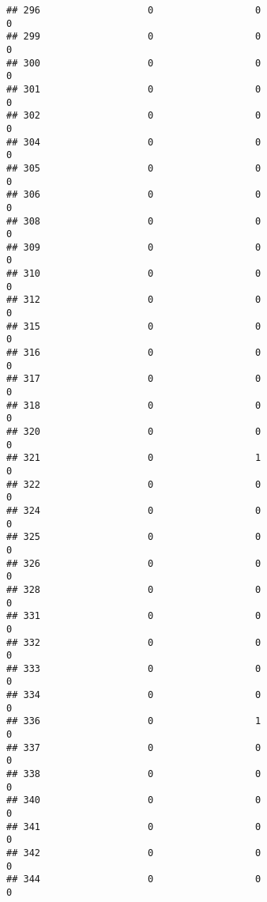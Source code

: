 \documentclass[
]{article}
\begin{document}
\begin{verbatim}
## 296                   0                  0                              0
## 299                   0                  0                              0
## 300                   0                  0                              0
## 301                   0                  0                              0
## 302                   0                  0                              0
## 304                   0                  0                              0
## 305                   0                  0                              0
## 306                   0                  0                              0
## 308                   0                  0                              0
## 309                   0                  0                              0
## 310                   0                  0                              0
## 312                   0                  0                              0
## 315                   0                  0                              0
## 316                   0                  0                              0
## 317                   0                  0                              0
## 318                   0                  0                              0
## 320                   0                  0                              0
## 321                   0                  1                              0
## 322                   0                  0                              0
## 324                   0                  0                              0
## 325                   0                  0                              0
## 326                   0                  0                              0
## 328                   0                  0                              0
## 331                   0                  0                              0
## 332                   0                  0                              0
## 333                   0                  0                              0
## 334                   0                  0                              0
## 336                   0                  1                              0
## 337                   0                  0                              0
## 338                   0                  0                              0
## 340                   0                  0                              0
## 341                   0                  0                              0
## 342                   0                  0                              0
## 344                   0                  0                              0

\end{verbatim}
\end{document}
